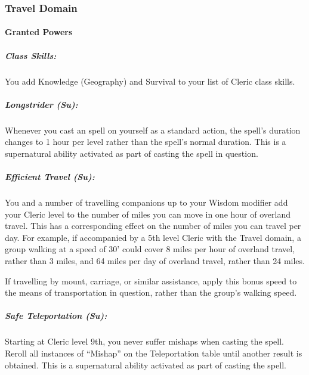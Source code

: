 \subsubsection{Travel Domain}
\paragraph{Granted Powers}
\subparagraph{Class Skills:} 
You add Knowledge (Geography) and Survival to your list of Cleric class skills.
\subparagraph{Longstrider (Su):}
Whenever you cast an  spell on yourself as a standard action, the spell's duration changes to 1 hour per level rather than the spell's normal duration.
This is a supernatural ability activated as part of casting the spell in question.
\subparagraph{Efficient Travel (Su):}
You and a number of travelling companions up to your Wisdom modifier add your Cleric level to the number of miles you can move in one hour of overland travel.
This has a corresponding effect on the number of miles you can travel per day.
For example, if accompanied by a 5th level Cleric with the Travel domain, a group walking at a speed of 30' could cover 8 miles per hour of overland travel, rather than 3 miles, and 64 miles per day of overland travel, rather than 24 miles.

If travelling by mount, carriage, or similar assistance, apply this bonus speed to the means of transportation in question, rather than the group's walking speed.
\subparagraph{Safe Teleportation (Su):}
Starting at Cleric level 9th, you never suffer mishaps when casting the  spell.
Reroll all instances of ``Mishap'' on the Teleportation table until another result is obtained.
This is a supernatural ability activated as part of casting the spell.
